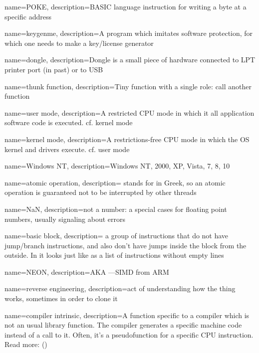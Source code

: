 {
  name=POKE,
  description={BASIC language instruction for writing a byte at a specific address}
}

{
  name=keygenme,
  description={A program which imitates software protection,
  for which one needs to make a key/license generator}
} %

{
  name=dongle,
  description={Dongle is a small piece of hardware connected to LPT printer port (in past) or to USB}
}

{
  name=thunk function,
  description={Tiny function with a single role: call another function}
}

{
  name=user mode,
  description={A restricted CPU mode in which it all application software code is executed. cf. \gls{kernel mode}}
}

{
  name=kernel mode,
  description={A restrictions-free CPU mode in which the OS kernel and drivers execute. cf. \gls{user mode}}
}

{
  name=Windows NT,
  description={Windows NT, 2000, XP, Vista, 7, 8, 10}
}

{
  name=atomic operation,
  description={
  stands for  in Greek, so an atomic operation is guaranteed not
  to be interrupted by other threads}
}

{
  name=NaN,
  description={not a number: 
  	a special cases for floating point numbers, usually signaling about errors}
}

{
  name=basic block,
  description={
	a group of 
	instructions that do not have jump/branch instructions, and also don't have
	jumps inside the block from the outside.
	In \IDA it looks just like as a list of instructions without empty lines}
}

{
  name=NEON,
  description={\ac{AKA} ---\ac{SIMD} from ARM}
}

{
  name=reverse engineering,
  description={act of understanding how the thing works, sometimes in order to clone it}
}

{
  name=compiler intrinsic,
  description={A function specific to a compiler which is not an usual library function.
	The compiler generates a specific machine code instead of a call to it.
	Often, it's a pseudofunction for a specific \ac{CPU} instruction. Read more:}
 ()
}

